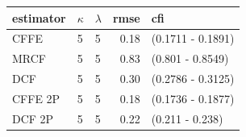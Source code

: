 \begin{tabular}{lllrl}
  \hline
estimator & $\kappa$ & $\lambda$ & rmse & cfi \\ 
  \hline
CFFE  & 5 & 5 & 0.18 & (0.1711 - 0.1891) \\ 
  MRCF  & 5 & 5 & 0.83 & (0.801 - 0.8549) \\ 
  DCF  & 5 & 5 & 0.30 & (0.2786 - 0.3125) \\ 
  CFFE 2P  & 5 & 5 & 0.18 & (0.1736 - 0.1877) \\ 
  DCF 2P  & 5 & 5 & 0.22 & (0.211 - 0.238) \\ 
   \hline
\end{tabular}
